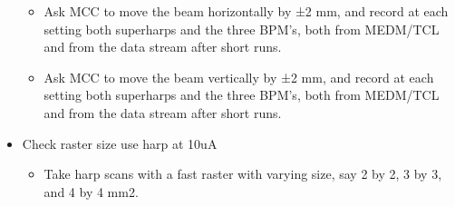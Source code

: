 \documentclass[]{article}
\begin{document}
\begin{itemize}
		\begin{itemize}
			\item
			Ask MCC to move the beam horizontally by ±2 mm, and record at each
			setting both superharps and the three BPM's, both from MEDM/TCL and
			from the data stream after short runs.
			\item
			Ask MCC to move the beam vertically by ±2 mm, and record at each
			setting both superharps and the three BPM's, both from MEDM/TCL and
			from the data stream after short runs.
		\end{itemize}
		\item
		Check raster size use harp at 10uA
		
		\begin{itemize}
			\item
			Take harp scans with a fast raster with varying size, say 2 by 2, 3
			by 3, and 4 by 4 mm2.
		\end{itemize}
	\end{itemize}
\end{document}
